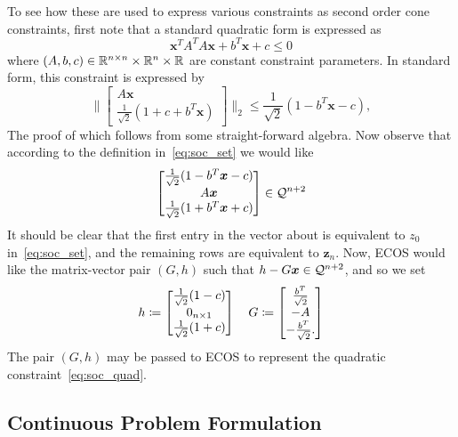 \documentclass[10pt]{article}
\begin{document}
To see how these are used to express various constraints as second order cone constraints, first note that a standard quadratic form is expressed as
\begin{equation}
\bm{x}^T A ^T A \bm{x} + b^T \bm{x} + c \leq 0
\label{eq:soc_quad}
\end{equation}
where $(A,b,c) \in {\mathbb{R}}^{n\times n} \times {\mathbb{R}}^n \times {\mathbb{R}}$ are constant constraint parameters. In standard form, this constraint is expressed by
\begin{equation}
\biggr\| \begin{bmatrix}
A \bm{x} \\ \frac{1}{\sqrt{2}}( 1 + c + b^T \bm{x} )
\end{bmatrix} \biggr\|_2 \leq \frac{1}{\sqrt{2}} ( 1 - b^T \bm{x} - c),
\label{eq:soc_std}
\end{equation} 
The proof of which follows from some straight-forward algebra. Now observe that according to the definition in~\eqref{eq:soc_set} we would like
\begin{equation*}
\begin{bmatrix}
\frac{1}{\sqrt{2}} ( 1 - b^T \bm{x} - c) \\
A \bm{x} \\
\frac{1}{\sqrt{2}} ( 1 + b^T \bm{x} + c)
\end{bmatrix} \in \mathcal{Q}^{n+2}
\end{equation*}
It should be clear that the first entry in the vector about is equivalent to $z_0$ in~\eqref{eq:soc_set}, and the remaining rows are equivalent to $\bm{z}_n$. Now, ECOS would like the matrix-vector pair $(G,h)$ such that $h-G\bm{x}\in\mathcal{Q}^{n+2}$, and so we set
\begin{equation}
h \coloneqq \begin{bmatrix}
\frac{1}{\sqrt{2}}( 1 - c ) \\ 0_{n \times 1} \\ \frac{1}{\sqrt{2}}(1+c)
\end{bmatrix} \quad G \coloneqq \begin{bmatrix}
\frac{b^T}{\sqrt{2}} \\ -A \\ -\frac{b^T}{\sqrt{2}}.
\end{bmatrix}
\end{equation}
The pair $(G,h)$ may be passed to ECOS to represent the quadratic constraint~\eqref{eq:soc_quad}.

\subsection*{Continuous Problem Formulation}
\end{document}
